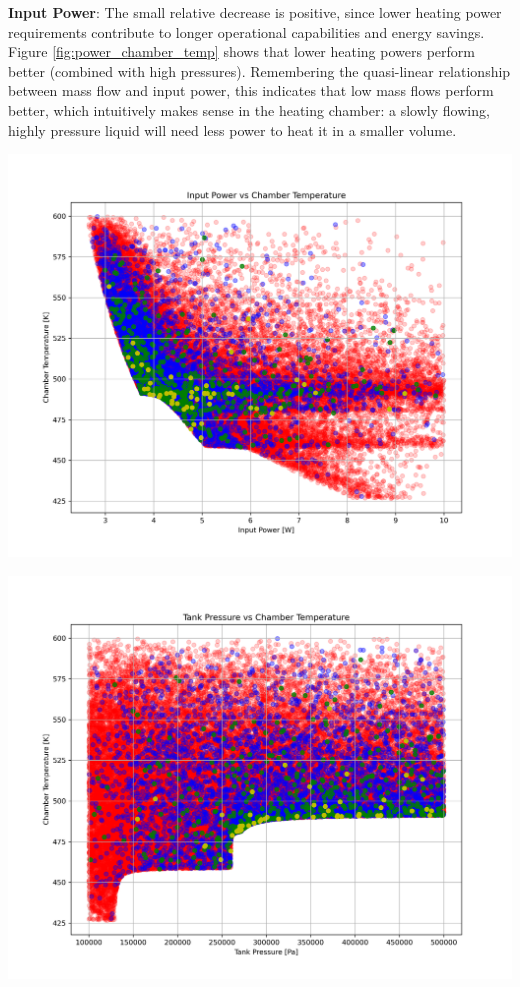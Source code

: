 \documentclass{homework}
\begin{document}
\begin{multicols}{2}
\textbf{Input Power}: The small relative decrease is positive, since lower heating power requirements contribute to longer operational capabilities and energy savings. Figure \ref{fig:power_chamber_temp} shows that lower heating powers perform better (combined with high pressures). Remembering the quasi-linear relationship between mass flow and input power, this indicates that low mass flows perform better, which intuitively makes sense in the heating chamber: a slowly flowing, highly pressure liquid will need less power to heat it in a smaller volume.

\begin{minipage}{\linewidth}
  \centering
  \includegraphics[width=\linewidth]{images/input_power_chamber_temperature.png}
  \label{fig:power_chamber_temp}
\end{minipage}

\begin{minipage}{\linewidth}
  \centering
  \includegraphics[width=\linewidth]{images/tank_pressure_chamber_temperature.png}
  \label{fig:pressure_chamber_temp}
\end{minipage}


\end{multicols}
\end{document}
